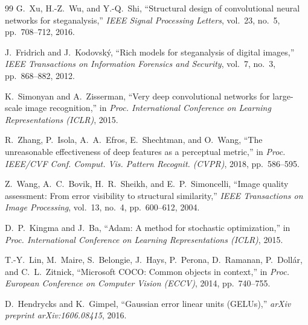\documentclass[conference]{IEEEtran}
\begin{document}
\begin{thebibliography}{99}
G.\ Xu, H.-Z.\ Wu, and Y.-Q.\ Shi, ``Structural design of convolutional neural networks for steganalysis,'' \emph{IEEE Signal Processing Letters}, vol.\ 23, no.\ 5, pp.\ 708--712, 2016.

J.\ Fridrich and J.\ Kodovsk\'y, ``Rich models for steganalysis of digital images,'' \emph{IEEE Transactions on Information Forensics and Security}, vol.\ 7, no.\ 3, pp.\ 868--882, 2012.

K.\ Simonyan and A.\ Zisserman, ``Very deep convolutional networks for large-scale image recognition,'' in \emph{Proc. International Conference on Learning Representations (ICLR)}, 2015.

R.\ Zhang, P.\ Isola, A.~A.\ Efros, E.\ Shechtman, and O.\ Wang, ``The unreasonable effectiveness of deep features as a perceptual metric,'' in \emph{Proc. IEEE/CVF Conf. Comput. Vis. Pattern Recognit. (CVPR)}, 2018, pp.\ 586--595.

Z.\ Wang, A.~C.\ Bovik, H.~R.\ Sheikh, and E.~P.\ Simoncelli, ``Image quality assessment: From error visibility to structural similarity,'' \emph{IEEE Transactions on Image Processing}, vol.\ 13, no.\ 4, pp.\ 600--612, 2004.

D.~P.\ Kingma and J.\ Ba, ``Adam: A method for stochastic optimization,'' in \emph{Proc. International Conference on Learning Representations (ICLR)}, 2015.

T.-Y.\ Lin, M.\ Maire, S.\ Belongie, J.\ Hays, P.\ Perona, D.\ Ramanan, P.\ Doll\'ar, and C.~L.\ Zitnick, ``Microsoft COCO: Common objects in context,'' in \emph{Proc. European Conference on Computer Vision (ECCV)}, 2014, pp.\ 740--755.

D.\ Hendrycks and K.\ Gimpel, ``Gaussian error linear units (GELUs),'' \emph{arXiv preprint arXiv:1606.08415}, 2016.

\end{thebibliography}
\end{document}
